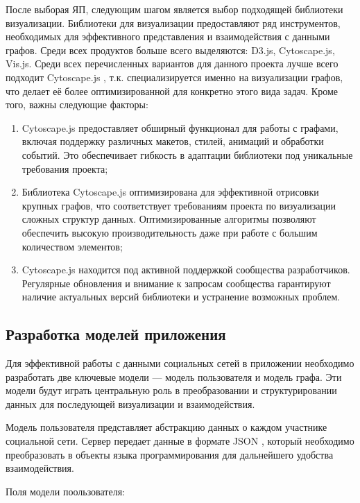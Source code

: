 \documentclass[14pt, russian]{scrartcl}
\begin{document}
После выборая ЯП, следующим шагом является выбор подходящей библиотеки визуализации. Библиотеки для визуализации предоставляют ряд инструментов, необходимых для эффективного представления и взаимодействия с данными графов. Среди всех продуктов больше всего выделяются: D3.js, Cytoscape.js, Vis.js. Среди всех перечисленных вариантов для данного проекта лучше всего подходит Cytoscape.js \cite{Cytoscapejs}, т.к.
специализируется именно на визуализации графов, что делает её более оптимизированной для конкретно этого вида задач. Кроме того, важны следующие факторы:

\begin{enumerate}
	\item Cytoscape.js предоставляет обширный функционал для работы с графами, включая поддержку различных макетов, стилей, анимаций и обработки событий. Это обеспечивает гибкость в адаптации библиотеки под уникальные требования проекта;

	\item Библиотека Cytoscape.js оптимизирована для эффективной отрисовки крупных графов, что соответствует требованиям проекта по визуализации сложных структур данных. Оптимизированные алгоритмы позволяют обеспечить высокую производительность даже при работе с большим количеством элементов;


	\item Cytoscape.js находится под активной поддержкой сообщества разработчиков. Регулярные обновления и внимание к запросам сообщества гарантируют наличие актуальных версий библиотеки и устранение возможных проблем.

\end{enumerate}

\subsection{Разработка моделей приложения}


Для эффективной работы с данными социальных сетей в приложении необходимо разработать две ключевые модели --- модель пользователя и модель графа. Эти модели будут играть центральную роль в преобразовании и структурировании данных для последующей визуализации и взаимодействия.

Модель пользователя представляет абстракцию данных о каждом участнике социальной сети. Сервер передает данные в формате JSON \cite{JSON}, который необходимо преобразовать в объекты языка программирования для дальнейшего удобства взаимодействия.

Поля модели поользователя:
\end{document}
